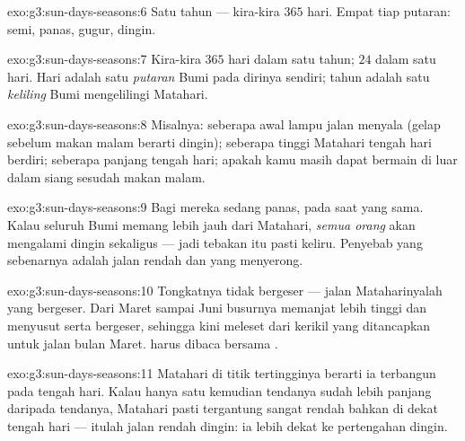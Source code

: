 \begin{solution}{exo:g3:sun-days-seasons:6}
Satu tahun --- kira-kira $365$ hari. Empat  tiap putaran: semi,
panas, gugur, dingin.
\end{solution}

\begin{solution}{exo:g3:sun-days-seasons:7}
Kira-kira $365$ hari dalam satu tahun; $24$  dalam satu hari. Hari
adalah satu \emph{putaran} Bumi pada dirinya sendiri; tahun adalah
satu \emph{keliling} Bumi mengelilingi Matahari.
\end{solution}

\begin{solution}{exo:g3:sun-days-seasons:8}
Misalnya: seberapa awal lampu jalan menyala (gelap sebelum makan malam
berarti  dingin); seberapa tinggi Matahari tengah hari berdiri;
seberapa panjang  tengah hari; apakah kamu masih dapat
bermain di luar dalam  siang sesudah makan malam.
\end{solution}

\begin{solution}{exo:g3:sun-days-seasons:9}
Bagi mereka sedang  panas, pada saat yang sama. Kalau seluruh
Bumi memang lebih jauh dari Matahari, \emph{semua orang} akan
mengalami  dingin sekaligus --- jadi tebakan itu pasti keliru.
Penyebab yang sebenarnya adalah jalan rendah dan  yang
menyerong.
\end{solution}

\begin{solution}{exo:g3:sun-days-seasons:10}
Tongkatnya tidak bergeser --- jalan Mataharinyalah yang bergeser. Dari
Maret sampai Juni busurnya memanjat lebih tinggi dan 
menyusut serta bergeser, sehingga  kini meleset dari
kerikil yang ditancapkan untuk jalan bulan Maret.  harus
dibaca bersama .
\end{solution}

\begin{solution}{exo:g3:sun-days-seasons:11}
Matahari di titik tertingginya berarti ia terbangun pada tengah hari.
Kalau hanya satu  kemudian  tendanya sudah lebih
panjang daripada tendanya, Matahari pasti tergantung sangat rendah
bahkan di dekat tengah hari --- itulah jalan rendah  dingin: ia
lebih dekat ke pertengahan  dingin.
\end{solution}
